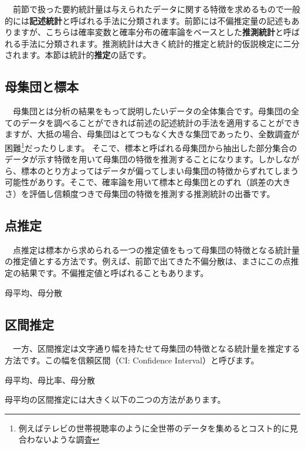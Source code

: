 \documentclass[
  12pt,
]{book}
\begin{document}
　前節で扱った要約統計量は与えられたデータに関する特徴を求めるもので一般的には\textbf{記述統計}と呼ばれる手法に分類されます。前節には不偏推定量の記述もありますが、こちらは確率変数と確率分布の確率論をベースとした\textbf{推測統計}と呼ばれる手法に分類されます。推測統計は大きく統計的推定と統計的仮説検定に二分されます。本節は統計的\textbf{推定}の話です。

\hypertarget{ux6bcdux96c6ux56e3ux3068ux6a19ux672c}{%
\subsection{母集団と標本}\label{ux6bcdux96c6ux56e3ux3068ux6a19ux672c}}

　母集団とは分析の結果をもって説明したいデータの全体集合です。母集団の全てのデータを調べることができれば前述の記述統計の手法を適用することができますが、大抵の場合、母集団はとてつもなく大きな集団であったり、全数調査が困難\footnote{例えばテレビの世帯視聴率のように全世帯のデータを集めるとコスト的に見合わないような調査}だったりします。 そこで、標本と呼ばれる母集団から抽出した部分集合のデータが示す特徴を用いて母集団の特徴を推測することになります。しかしながら、標本のとり方よってはデータが偏ってしまい母集団の特徴からずれてしまう可能性がありす。そこで、確率論を用いて標本と母集団とのずれ（誤差の大きさ）を評価し信頼度つきで母集団の特徴を推測する推測統計の出番です。

\hypertarget{ux70b9ux63a8ux5b9a}{%
\subsection{点推定}\label{ux70b9ux63a8ux5b9a}}

　点推定は標本から求められる一つの推定値をもって母集団の特徴となる統計量の推定値とする方法です。例えば、前節で出てきた不偏分散は、まさにこの点推定の結果です。不偏推定値と呼ばれることもあります。

母平均、母分散

\hypertarget{ux533aux9593ux63a8ux5b9a}{%
\subsection{区間推定}\label{ux533aux9593ux63a8ux5b9a}}

　一方、区間推定は文字通り幅を持たせて母集団の特徴となる統計量を推定する方法です。この幅を信頼区間（CI: Confidence Interval）と呼びます。

母平均、母比率、母分散

母平均の区間推定には大きく以下の二つの方法があります。
\end{document}
